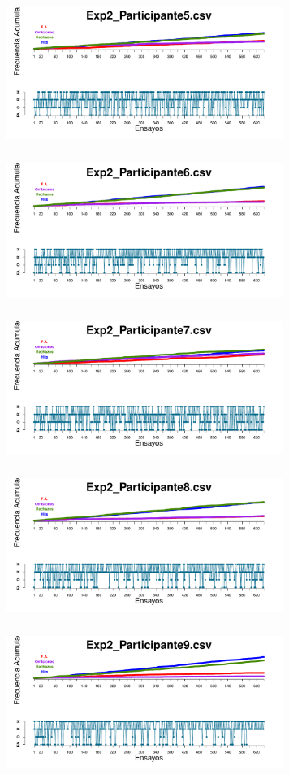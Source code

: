 \documentclass[a4paper ]{article}
\begin{document}
\begin{figure}[th]
\includegraphics[width=9cm, height=5cm]{Figures/Outcome_Exp2_P5} \includegraphics[width=9cm, height=5cm]{Figures/Outcome_Exp2_P6}
\includegraphics[width=9cm, height=5cm]{Figures/Outcome_Exp2_P7} \includegraphics[width=9cm, height=5cm]{Figures/Outcome_Exp2_P8} 
\includegraphics[width=9cm, height=5cm]{Figures/Outcome_Exp2_P9}
\end{figure}
\end{document}
